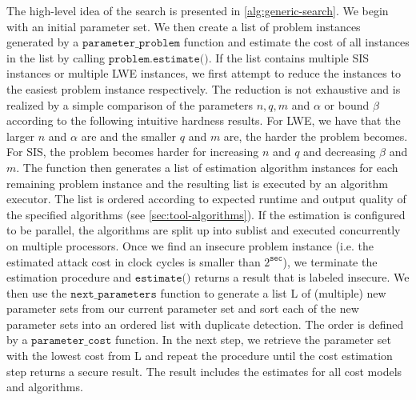 The high-level idea of the search is presented in \cref{alg:generic-search}. We begin with an initial parameter set. We then create a list of problem instances generated by a $\texttt{parameter\_problem}$ function and estimate the cost of all instances in the list by calling $\texttt{problem.estimate()}$. If the list contains multiple SIS instances or multiple LWE instances, we first attempt to reduce the instances to the easiest problem instance respectively. The reduction is not exhaustive and is realized by a simple comparison of the parameters $n, q, m$ and $\alpha$ or bound $\beta$ according to the following intuitive hardness results. For LWE, we have that the larger $n$ and $\alpha$ are and the smaller $q$ and $m$ are, the harder the problem becomes. For SIS, the problem becomes harder for increasing $n$ and $q$ and decreasing $\beta$ and $m$. The function then generates a list of estimation algorithm instances for each remaining problem instance and the resulting list is executed by an algorithm executor. The list is ordered according to expected runtime and output quality of the specified algorithms (see \cref{sec:tool-algorithms}). If the estimation is configured to be parallel, the algorithms are split up into sublist and executed concurrently on multiple processors.
Once we find an insecure problem instance (i.e. the estimated attack cost in clock cycles is smaller than $2^{\texttt{sec}}$), we terminate the estimation procedure and $\texttt{estimate()}$ returns a result that is labeled insecure. We then use the $\texttt{next\_parameters}$ function to generate a list L of (multiple) new parameter sets from our current parameter set and sort each of the new parameter sets into an ordered list with duplicate detection. The order is defined by a $\texttt{parameter\_cost}$ function. In the next step, we retrieve the parameter set with the lowest cost from L and repeat the procedure until the cost estimation step returns a secure result. The result includes the estimates for all cost models and algorithms.

